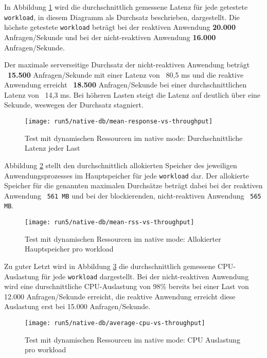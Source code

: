 In Abbildung \ref{fig:native_dynamic_mean_response} wird die durchschnittlich gemessene Latenz für jede getestete \verb|workload|,
in diesem Diagramm als Durchsatz beschrieben, dargestellt.
Die höchste getestete \verb|workload| beträgt bei der reaktiven Anwendung \textbf{20.000} Anfragen/Sekunde und bei der
nicht-reaktiven Anwendung \textbf{16.000} Anfragen/Sekunde.

Der maximale serverseitige Durchsatz der nicht-reaktiven Anwendung beträgt ~\textbf{15.500} Anfragen/Sekunde mit einer
Latenz von ~80,5 ms und
die reaktive Anwendung erreicht ~\textbf{18.500} Anfragen/Sekunde bei einer durchschnittlichen Latenz von ~14,3 ms.
Bei höheren Lasten steigt die Latenz auf deutlich über eine Sekunde, weswegen der Durchsatz stagniert.

\begin{figure}[ht!]
    \centering
    \texttt{[image: run5/native-db/mean-response-vs-throughput]}
    \caption{Test mit dynamischen Ressourcen im native mode: Durchschnittliche Latenz jeder Last}
    \label{fig:native_dynamic_mean_response}
\end{figure}
\newpage
Abbildung \ref{fig:native_dynamic_mean_rss} stellt den durchschnittlich allokierten Speicher des jeweiligen Anwendungsprozesses
im Hauptspeicher für jede \verb|workload| dar. Der allokierte Speicher für die genannten maximalen Durchsätze beträgt dabei bei
der reaktiven Anwendung ~\verb|561 MB| und bei der blockierenden, nicht-reaktiven Anwendung ~\verb|565 MB|.

\begin{figure}[ht!]
    \centering
    \texttt{[image: run5/native-db/mean-rss-vs-throughput]}
    \caption{Test mit dynamischen Ressourcen im native mode: Allokierter Hauptspeicher pro workload}
    \label{fig:native_dynamic_mean_rss}
\end{figure}

Zu guter Letzt wird in Abbildung \ref{fig:native_dynamic_avg_cpu} die durchschnittlich gemessene CPU-Auslastung für jede \verb|workload|
dargestellt. Bei der nicht-reaktiven Anwendung wird eine durschnittliche CPU-Auslastung von 98\% bereits bei einer Last von
12.000 Anfragen/Sekunde erreicht, die reaktive Anwendung erreicht diese Auslastung erst bei 15.000 Anfragen/Sekunde.
\newpage
\begin{figure}[ht!]
    \centering
    \texttt{[image: run5/native-db/average-cpu-vs-throughput]}
    \caption{Test mit dynamischen Ressourcen im native mode: CPU Auslastung pro workload}
    \label{fig:native_dynamic_avg_cpu}
\end{figure}

